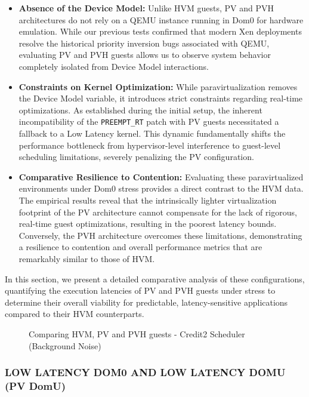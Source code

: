 \begin{itemize}
\item
  \textbf{Absence of the Device Model:} Unlike HVM guests, PV and PVH
  architectures do not rely on a QEMU instance running in Dom0 for
  hardware emulation. While our previous tests confirmed that modern Xen
  deployments resolve the historical priority inversion bugs associated
  with QEMU, evaluating PV and PVH guests allows us to observe system
  behavior completely isolated from Device Model interactions.
\item
  \textbf{Constraints on Kernel Optimization:} While paravirtualization
  removes the Device Model variable, it introduces strict constraints
  regarding real-time optimizations. As established during the initial
  setup, the inherent incompatibility of the \texttt{PREEMPT\_RT} patch
  with PV guests necessitated a fallback to a Low Latency kernel. This
  dynamic fundamentally shifts the performance bottleneck from
  hypervisor-level interference to guest-level scheduling limitations,
  severely penalizing the PV configuration.
\item
  \textbf{Comparative Resilience to Contention:} Evaluating these
  paravirtualized environments under Dom0 stress provides a direct
  contrast to the HVM data. The empirical results reveal that the
  intrinsically lighter virtualization footprint of the PV architecture
  cannot compensate for the lack of rigorous, real-time guest
  optimizations, resulting in the poorest latency bounds. Conversely,
  the PVH architecture overcomes these limitations, demonstrating a
  resilience to contention and overall performance metrics that are
  remarkably similar to those of HVM.
\end{itemize}

In this section, we present a detailed comparative analysis of these
configurations, quantifying the execution latencies of PV and PVH guests
under stress to determine their overall viability for predictable,
latency-sensitive applications compared to their HVM counterparts.

\begin{figure}
\centering

\caption{Comparing HVM, PV and PVH guests - Credit2 Scheduler
(Background Noise)}
\end{figure}

\subsubsection{LOW LATENCY DOM0 AND LOW LATENCY DOMU (PV
DomU)}\label{low-latency-dom0-and-low-latency-domu-pv-domu-1}

